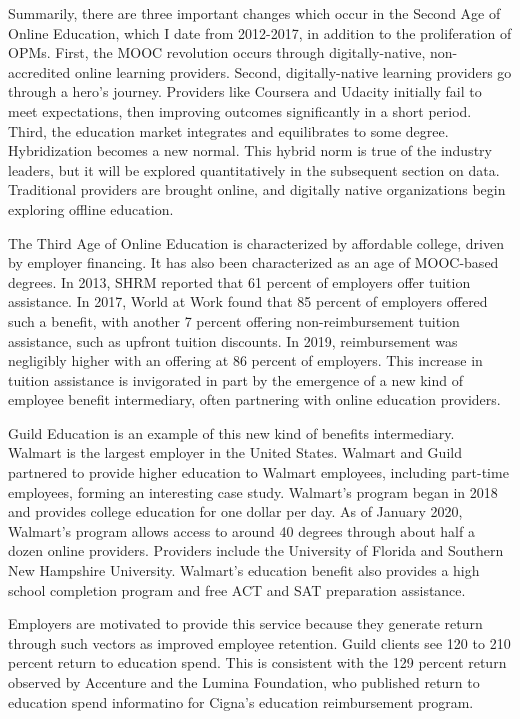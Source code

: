 \documentclass[review]{elsarticle}
\begin{document}
Summarily, there are three important changes which occur in the Second Age of Online Education, which I date from 2012-2017, in addition to the proliferation of OPMs.
First, the MOOC revolution occurs through digitally-native, non-accredited online learning providers.
Second, digitally-native learning providers go through a hero's journey.
Providers like Coursera and Udacity initially fail to meet expectations, then improving outcomes significantly in a short period.
Third, the education market integrates and equilibrates to some degree.
Hybridization becomes a new normal.
This hybrid norm is true of the industry leaders, but it will be explored quantitatively in the subsequent section on data.
Traditional providers are brought online, and digitally native organizations begin exploring offline education.

The Third Age of Online Education is characterized by affordable college, driven by employer financing.
It has also been characterized as an age of MOOC-based degrees.
In 2013, SHRM reported that 61 percent of employers offer tuition assistance\cite{cherry2014rejuvenating}.
In 2017, World at Work found that 85 percent of employers offered such a benefit,
with another 7 percent offering non-reimbursement tuition assistance, such as upfront tuition discounts\cite{talentculture_2018}.
In 2019, reimbursement was negligibly higher with an offering at 86 percent of employers\cite{worldatwork_2019}.
This increase in tuition assistance is invigorated in part by the emergence of a new kind of employee benefit intermediary,
often partnering with online education providers.

Guild Education is an example of this new kind of benefits intermediary. Walmart is the largest employer in the United States.
Walmart and Guild partnered to provide higher education to Walmart employees, including part-time employees, forming an interesting case study.
Walmart's program began in 2018 and provides college education for one dollar per day\cite{walmart_2018}.
As of January 2020, Walmart's program allows access to around 40 degrees through about half a dozen online providers\cite{guild_walmart_2020}.
Providers include the University of Florida and Southern New Hampshire University.
Walmart's education benefit also provides a high school completion program and free ACT and SAT preparation assistance.

Employers are motivated to provide this service because they generate return through such vectors as improved employee retention.
Guild clients see 120 to 210 percent return to education spend\cite{hunter_2019}.
This is consistent with the 129 percent return observed by Accenture and the Lumina Foundation,
who published return to education spend informatino for Cigna's education reimbursement program\cite{mccann_2016}.
\end{document}
